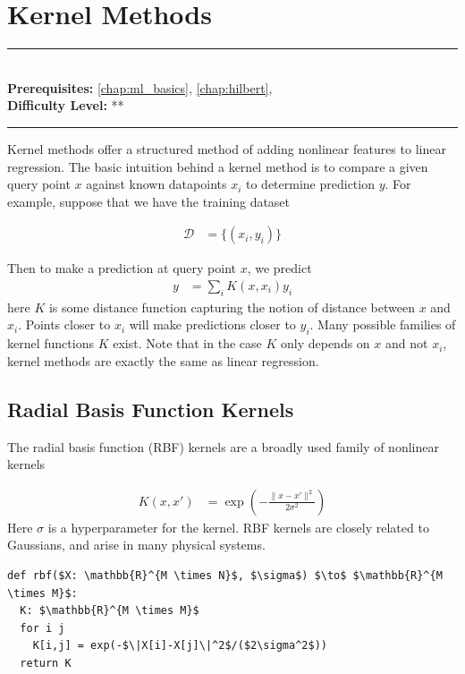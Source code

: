\documentclass[book.tex]{subfiles}
\begin{document}
\chapter{Kernel Methods}

\label{chap:kernel_methods}
\noindent\rule{11cm}{0.4pt} \\
\textbf{Prerequisites:}  \autoref{chap:ml_basics}, \autoref{chap:hilbert},  \\
\textbf{Difficulty Level:} ** \\
\noindent\rule{11cm}{0.4pt}
\vspace{5mm}

Kernel methods offer a structured method of adding nonlinear features to linear regression. The basic intuition behind a kernel method is to compare a given query point $x$ against known datapoints $x_i$ to determine prediction $y$. For example, suppose that we have the training dataset

\begin{align}
\mathcal{D} &= \{(x_i, y_i) \}
\end{align}

Then to make a prediction at query point $x$, we predict
\begin{align}
    y &= \sum_i K(x, x_i) y_i
\end{align}
here $K$ is some distance function capturing the notion of distance between $x$ and $x_i$. Points closer to $x_i$ will make predictions closer to $y_i$. Many possible families of kernel functions $K$ exist. Note that in the case $K$ only depends on $x$ and not $x_i$, kernel methods are exactly the same as linear regression.

\section{Radial Basis Function Kernels}

The radial basis function (RBF) kernels are a broadly used family of nonlinear kernels

\begin{align}
K(x, x') &= \exp \left ( - \frac{\|x - x'\|^2}{2 \sigma^2} \right )
\end{align}
Here $\sigma$ is a hyperparameter for the kernel. RBF kernels are closely related to Gaussians, and arise in many physical systems.

\begin{lstlisting}
def rbf($X: \mathbb{R}^{M \times N}$, $\sigma$) $\to$ $\mathbb{R}^{M \times M}$:
  K: $\mathbb{R}^{M \times M}$
  for i j
    K[i,j] = exp(-$\|X[i]-X[j]\|^2$/($2\sigma^2$))
  return K
\end{lstlisting}
\end{document}
